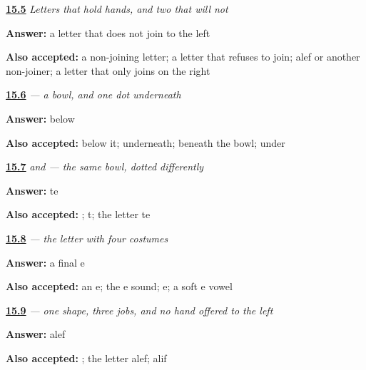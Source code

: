 \noindent\begin{minipage}[t]{\linewidth}
\raggedright
\hyperlink{review-FA-W15-joining-break}{\textbf{15.5}} \emph{Letters that hold hands, and two that will not}\par
\small \textbf{Answer:} a letter that does not join to the left\par
\footnotesize \textbf{Also accepted:} a non-joining letter; a letter that refuses to join; alef or another non-joiner; a letter that only joins on the right
\end{minipage}\par\medskip

\noindent\begin{minipage}[t]{\linewidth}
\raggedright
\hyperlink{review-FA-W15-be-dot}{\textbf{15.6}} \emph{ — a bowl, and one dot underneath}\par
\small \textbf{Answer:} below\par
\footnotesize \textbf{Also accepted:} below it; underneath; beneath the bowl; under
\end{minipage}\par\medskip

\noindent\begin{minipage}[t]{\linewidth}
\raggedright
\hyperlink{review-FA-W15-te-nun-dots}{\textbf{15.7}} \emph{ and  — the same bowl, dotted differently}\par
\small \textbf{Answer:} te\par
\footnotesize \textbf{Also accepted:} ; t; the letter te
\end{minipage}\par\medskip

\noindent\begin{minipage}[t]{\linewidth}
\raggedright
\hyperlink{review-FA-W15-he-final}{\textbf{15.8}} \emph{ — the letter with four costumes}\par
\small \textbf{Answer:} a final e\par
\footnotesize \textbf{Also accepted:} an e; the e sound; e; a soft e vowel
\end{minipage}\par\medskip

\noindent\begin{minipage}[t]{\linewidth}
\raggedright
\hyperlink{review-FA-W15-vav-join}{\textbf{15.9}} \emph{ — one shape, three jobs, and no hand offered to the left}\par
\small \textbf{Answer:} alef\par
\footnotesize \textbf{Also accepted:} ; the letter alef; alif
\end{minipage}\par\medskip

